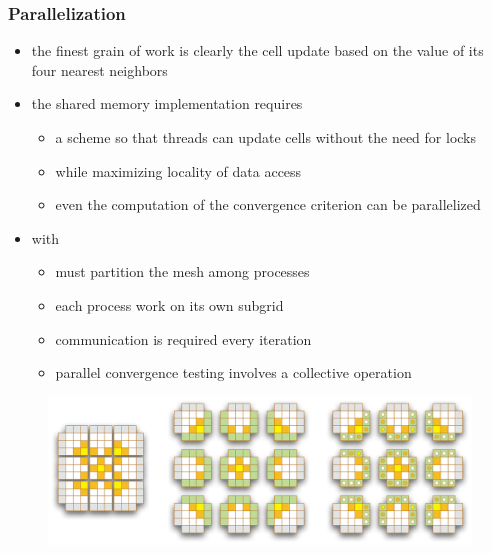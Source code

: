 \begin{frame}[fragile]
%
  \frametitle{Parallelization}
%
  \begin{itemize}
%
  \item the finest grain of work is clearly the cell update based on the value of its four
    nearest neighbors
%
  \item the shared memory implementation requires
    \begin{itemize}
    \item a scheme so that threads can update cells without the need for locks
    \item while maximizing locality of data access
    \item even the computation of the convergence criterion can be parallelized
    \end{itemize}
%
  \item with \mpi
    \begin{itemize}
    \item must partition the mesh among processes
    \item each process work on its own subgrid
    \item communication is required every iteration
    \item parallel convergence testing involves a collective operation
    \end{itemize}
%
  \end{itemize}
%
  \begin{figure}
    \includegraphics[scale=0.4]{figures/structured-partitioning.pdf}
  \end{figure} 
% 
\end{frame}

